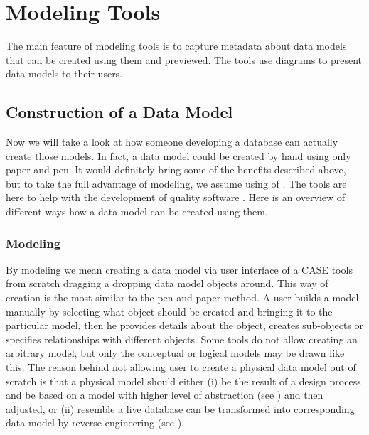 \chapter{Modeling Tools}
\label{modeling_tools}

The main feature of modeling tools is to capture metadata about data models that can be created using them and previewed. The tools use diagrams to present data models to their users.

\section{Construction of a Data Model}

Now we will take a look at how someone developing a database can actually create those models.
In fact, a data model could be created by hand using only paper and pen. It would definitely bring some of the benefits described above, but to take the full advantage of modeling, we assume using of . The tools are here to help with the development of quality software \cite{CASETools}. 
Here is an overview of different ways how a data model can be created using them.

\subsection{Modeling}

By modeling we mean creating a data model via user interface of a CASE tools from scratch dragging a dropping data model objects around. 
This way of creation is the most similar to the pen and paper method. A user builds a model manually by selecting what object should be created and bringing it to the particular model, then he provides details about the object, creates sub-objects or specifies relationships with different objects.
Some tools do not allow creating an arbitrary model, but only the conceptual or logical models may be drawn like this. 
The reason behind not allowing user to create a physical data model out of scratch is that a physical model should either (i) be the result of a design process and be based on a model with higher level of abstraction (see ) and then adjusted, or (ii) resemble a live database can be transformed into corresponding data model by reverse-engineering (see ).

